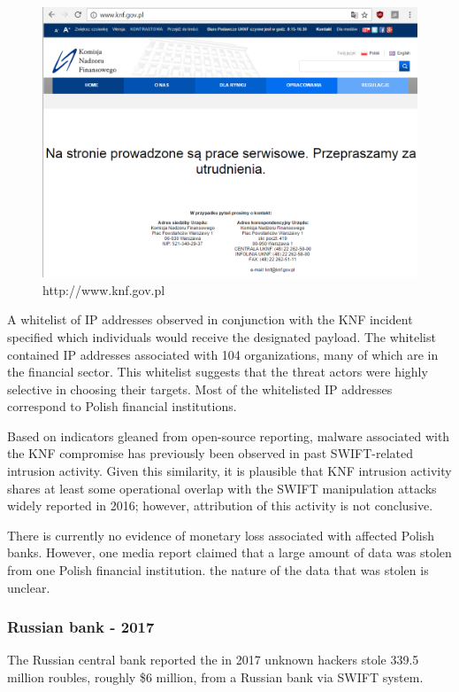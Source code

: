 \documentclass[12pt]{article}
\begin{document}
        \begin{figure}[H]
        \centering
        \includegraphics[width=\textwidth,cfbox=red 0.1mm 0.1mm]{figures/knf.png}
        \caption{http://www.knf.gov.pl}
        \label{fig:knf}
        \end{figure}
        
        A whitelist of IP addresses observed in conjunction with the KNF incident specified which individuals would receive the designated payload. The whitelist contained IP addresses associated with 104 organizations, many of which are in the financial sector. This whitelist suggests that the threat actors were highly selective in choosing their targets. Most of the whitelisted IP addresses correspond to Polish financial institutions. 
        
        Based on indicators gleaned from open-source reporting, malware associated with the KNF compromise has previously been observed in past SWIFT-related intrusion activity. Given this similarity, it is plausible that KNF intrusion activity shares at least some operational overlap with the SWIFT manipulation attacks widely reported in 2016; however, attribution of this activity is not conclusive.\cite{MungurkApt38}
       
        There is currently no evidence of monetary loss associated with affected Polish banks. However, one media report claimed that a large amount of data was stolen from one Polish financial institution. the nature of the data that was stolen is unclear.\cite{WlamaniaKilkuBankow}\cite{badcyberSeveralPolishBanks2017}\cite{PolishBanksInfected}
    
    \subsubsection{Russian bank - 2017}
        The Russian central bank reported the in 2017 unknown hackers stole 339.5 million roubles, roughly \$6 million, from a Russian bank via SWIFT system. 
        
\end{document}
